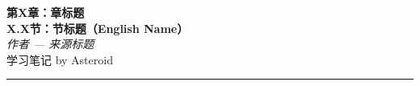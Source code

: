 \documentclass[11pt, a4paper]{ctexart}
\begin{document}
\begin{center}
  {\LARGE \textbf{第X章：章标题}} \\[4pt]
  {\LARGE \textbf{X.X节：节标题（English Name）}} \\[6pt]
  {\large \textit{作者 --- 来源标题}} \\[2pt]
  {\small 学习笔记  by Asteroid}
\end{center}


\vspace{0.5em}
\hrule
\vspace{1em}

\end{document}
